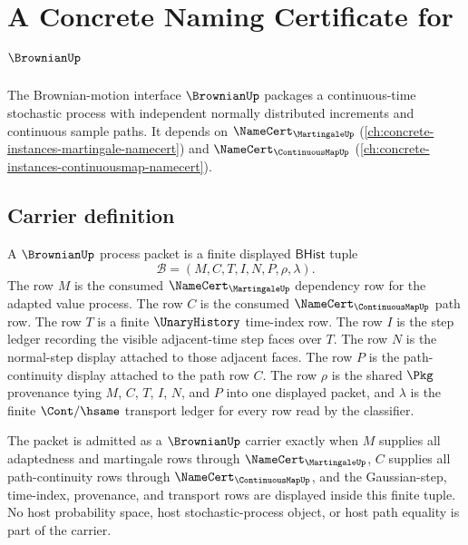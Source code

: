 \chapter{A Concrete Naming Certificate for $\BrownianUp$}
\label{ch:concrete-instances-brownian-namecert}

The Brownian-motion interface $\BrownianUp$ packages a continuous-time stochastic process with independent normally distributed increments and continuous sample paths. It depends on $\NameCert_{\MartingaleUp}$ (\autoref{ch:concrete-instances-martingale-namecert}) and $\NameCert_{\ContinuousMapUp}$ (\autoref{ch:concrete-instances-continuousmap-namecert}).

\section{Carrier definition}
\label{sec:brownian-carrier}

\begin{definition}
\label{def:brownian-bhist-process-packet}
A $\BrownianUp$ process packet is a finite displayed $\mathsf{BHist}$ tuple
$$
\mathcal{B}=(M,C,T,I,N,P,\rho,\lambda).
$$
The row $M$ is the consumed $\NameCert_{\MartingaleUp}$ dependency row for
the adapted value process. The row $C$ is the consumed
$\NameCert_{\ContinuousMapUp}$ path row. The row $T$ is a finite
$\UnaryHistory$ time-index row. The row $I$ is the step ledger recording the
visible adjacent-time step faces over $T$. The row $N$ is the normal-step
display attached to those adjacent faces. The row $P$ is the path-continuity
display attached to the path row $C$. The row $\rho$ is the shared $\Pkg$
provenance tying $M$, $C$, $T$, $I$, $N$, and $P$ into one displayed packet,
and $\lambda$ is the finite $\Cont/\hsame$ transport ledger for every row
read by the classifier.

The packet is admitted as a $\BrownianUp$ carrier exactly when $M$ supplies
all adaptedness and martingale rows through $\NameCert_{\MartingaleUp}$, $C$
supplies all path-continuity rows through $\NameCert_{\ContinuousMapUp}$, and
the Gaussian-step, time-index, provenance, and transport rows are displayed
inside this finite tuple. No host probability space, host stochastic-process
object, or host path equality is part of the carrier.
\end{definition}

